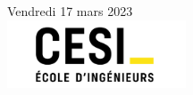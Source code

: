\documentclass[10pt,a4paper]{article}
\begin{document}
\begin{titlepage}


{\large Vendredi 17 mars 2023}\\[2cm] %


\includegraphics[width=200px, keepaspectratio]{img/Logo_cesi_2022.png}\\[1cm] %
 

\vfill %

\end{titlepage}
\newpage
\tableofcontents
\newpage

\newpage

\end{document}
